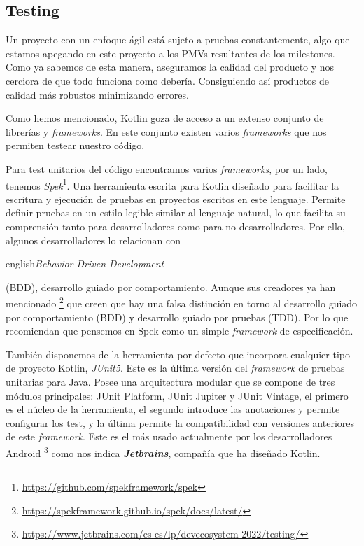 \subsection{Testing}

Un proyecto con un enfoque ágil está sujeto a pruebas constantemente, algo que estamos apegando en este proyecto a los PMVs resultantes de los milestones. Como ya sabemos de esta manera, aseguramos la calidad del producto y nos cerciora de que todo funciona como debería. Consiguiendo así productos de calidad más robustos minimizando errores.

Como hemos mencionado, Kotlin goza de acceso a un extenso conjunto de librerías y \textit{frameworks}. En este conjunto existen varios \textit{frameworks} que nos permiten testear nuestro código.

Para test unitarios del código encontramos varios \textit{frameworks}, por un lado, tenemos \textit{Spek}\footnote{\url{https://github.com/spekframework/spek}}. Una herramienta escrita para Kotlin diseñado para facilitar la escritura y ejecución de pruebas en proyectos escritos en este lenguaje. Permite definir pruebas en un estilo legible similar al lenguaje natural, lo que facilita su comprensión tanto para desarrolladores como para no desarrolladores. Por ello, algunos desarrolladores lo relacionan con \begin{otherlanguage}
{english}\textit{Behavior-Driven Development}\end{otherlanguage} (BDD), desarrollo guiado por comportamiento. Aunque sus creadores ya han mencionado \footnote{\url{https://spekframework.github.io/spek/docs/latest/}} que creen que hay una falsa distinción en torno al desarrollo guiado por comportamiento (BDD) y desarrollo guiado por pruebas (TDD). Por lo que recomiendan que pensemos en Spek como un simple \textit{framework} de especificación.

También disponemos de la herramienta por defecto que incorpora cualquier tipo de proyecto Kotlin, \textit{JUnit5}. Este es la última versión del \textit{framework} de pruebas unitarias para Java. Posee una arquitectura modular que se compone de tres módulos principales: JUnit Platform, JUnit Jupiter y JUnit Vintage, el primero es el núcleo de la herramienta, el segundo introduce las anotaciones y permite configurar los test, y la última permite la compatibilidad con versiones anteriores de este \textit{framework}. Este es el más usado actualmente por los desarrolladores Android \footnote{\url{https://www.jetbrains.com/es-es/lp/devecosystem-2022/testing/}} como nos indica \textbf{\textit{Jetbrains}}, compañía que ha diseñado Kotlin.

